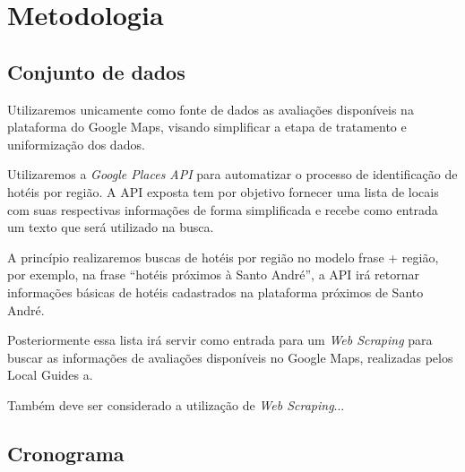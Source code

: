 \chapter{Metodologia}
\label{cap:metodologia}


\section{Conjunto de dados}

Utilizaremos unicamente como fonte de dados as avaliações disponíveis na plataforma do Google Maps, visando simplificar a etapa de tratamento e uniformização dos dados.

Utilizaremos a \emph{Google Places API} para automatizar o processo de identificação de hotéis por região. A API exposta tem por objetivo fornecer uma lista de locais com suas respectivas informações de forma simplificada e recebe como entrada um texto que será utilizado na busca.

A princípio realizaremos buscas de hotéis por região no modelo frase + região, por exemplo, na frase “hotéis próximos à Santo André”, a API irá retornar informações básicas de hotéis cadastrados na plataforma próximos de Santo André.


Posteriormente essa lista irá servir como entrada para um \emph{Web Scraping} para buscar as informações de avaliações disponíveis no Google Maps, realizadas pelos Local Guides\cite{google2022localguides} a.

Também deve ser considerado a utilização de \emph{Web Scraping}...

\section{Cronograma}
